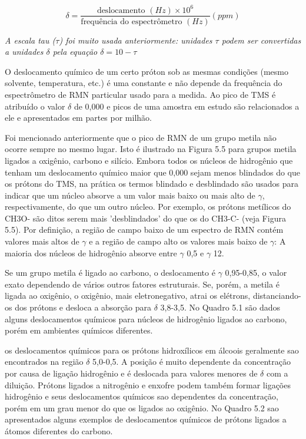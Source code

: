 \begin{equation}
\delta = \frac{\textrm{deslocamento } (Hz)\times10^6}{\textrm{frequência do espectrômetro } (Hz)}(ppm)
\end{equation}

\emph{A escala tau ($\tau$) foi muito usada anteriormente: unidades $\tau$ podem ser convertidas a unidades $\delta$ pela equação $\delta = 10 - \tau$}

O deslocamento químico de um certo próton sob as mesmas condições (mesmo solvente, temperatura, etc.) é uma constante e não depende da frequência do espectrômetro de RMN particular usado para a medida. Ao pico de TMS é atribuído o valor $\delta$ de 0,000 e picos de uma amostra em estudo são relacionados a ele e apresentados em partes por milhão. 

Foi mencionado anteriormente que o pico de RMN de um grupo metila não ocorre sempre no mesmo lugar. Isto é ilustrado na Figura 5.5 para grupos metila ligados a oxigênio, carbono e silício. Embora todos os núcleos de hidrogênio que tenham um deslocamento químico maior que 0,000 sejam menos blindados do que os prótons do TMS, na prática os termos blindado e desblindado são usados para indicar que um núcleo absorve a um valor mais baixo ou mais alto de $\gamma$, respectivamente, do que um outro núcleo. Por exemplo, os prótons metílicos do CH3O- são ditos serem mais 'desblindados' do que os do CH3-C- (veja Figura 5.5). Por definição, a região de campo baixo de um espectro de RMN contém valores mais altos de $\gamma$ e a região de campo alto os valores mais baixo de $\gamma$: A maioria dos núcleos de hidrogênio absorve entre $\gamma$ 0,5 e $\gamma$ 12.

Se um grupo metila é ligado ao carbono, o deslocamento é $\gamma$ 0,95-0,85, o valor exato dependendo de vários outros fatores estruturais. Se, porém, a metila é ligada ao oxigênio, o oxigênio, mais eletronegativo, atrai os elétrons, distanciando-os dos prótons e desloca a absorção para $\delta$ 3,8-3,5. No Quadro 5.1 são dados alguns deslocamentos químicos para núcleos de hidrogênio ligados ao carbono, porém em ambientes químicos diferentes.

os deslocamentos químicos para os prótons hidroxílicos em álcoois geralmente sao encontrados na região $\delta$ 5,0-0,5. A posição é muito dependente da concentração por causa de ligação hidrogênio e é deslocada para valores menores de $\delta$ com a diluição. Prótons ligados a nitrogênio e enxofre podem também formar ligações hidrogênio e seus deslocamentos químicos sao dependentes da concentração, porém em um grau menor do que os ligados ao oxigênio. No Quadro 5.2 sao apresentados alguns exemplos de deslocamentos químicos de prótons ligados a átomos diferentes do carbono.

